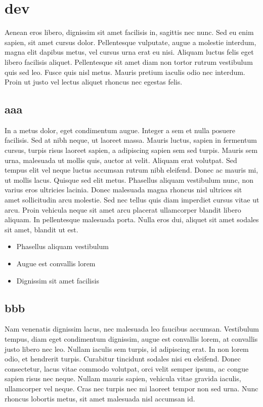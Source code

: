 \documentclass[10pt]{smile}
\begin{document}

\chapter{dev}
Aenean eros libero, dignissim sit amet facilisis in, sagittis nec nunc. Sed eu enim sapien, sit amet cursus dolor. Pellentesque vulputate, augue a molestie interdum, magna elit dapibus metus, vel cursus urna erat eu nisi. Aliquam luctus felis eget libero facilisis aliquet. Pellentesque sit amet diam non tortor rutrum vestibulum quis sed leo. Fusce quis nisl metus. Mauris pretium iaculis odio nec interdum. Proin ut justo vel lectus aliquet rhoncus nec egestas felis.


\section{aaa}
In a metus dolor, eget condimentum augue. Integer a sem et nulla posuere facilisis. Sed at nibh neque, ut laoreet massa. Mauris luctus, sapien in fermentum cursus, turpis risus laoreet sapien, a adipiscing sapien sem sed turpis. Mauris sem urna, malesuada ut mollis quis, auctor at velit. Aliquam erat volutpat. Sed tempus elit vel neque luctus accumsan rutrum nibh eleifend. Donec ac mauris mi, ut mollis lacus. Quisque sed elit metus. Phasellus aliquam vestibulum nunc, non varius eros ultricies lacinia. Donec malesuada magna rhoncus nisl ultrices sit amet sollicitudin arcu molestie. Sed nec tellus quis diam imperdiet cursus vitae ut arcu. Proin vehicula neque sit amet arcu placerat ullamcorper blandit libero aliquam. In pellentesque malesuada porta. Nulla eros dui, aliquet sit amet sodales sit amet, blandit ut est.

\begin{itemize}
	\item  Phasellus aliquam vestibulum
	\item  Augue est convallis lorem
	\item  Dignissim sit amet facilisis
\end{itemize}

\section{bbb}
Nam venenatis dignissim lacus, nec malesuada leo faucibus accumsan. Vestibulum tempus, diam eget condimentum dignissim, augue est convallis lorem, at convallis justo libero nec leo. Nullam iaculis sem turpis, id adipiscing erat. In non lorem odio, et hendrerit turpis. Curabitur tincidunt sodales nisi eu eleifend. Donec consectetur, lacus vitae commodo volutpat, orci velit semper ipsum, ac congue sapien risus nec neque. Nullam mauris sapien, vehicula vitae gravida iaculis, ullamcorper vel neque. Cras nec turpis nec mi laoreet tempor non sed urna. Nunc rhoncus lobortis metus, sit amet malesuada nisl accumsan id.
\end{document}
